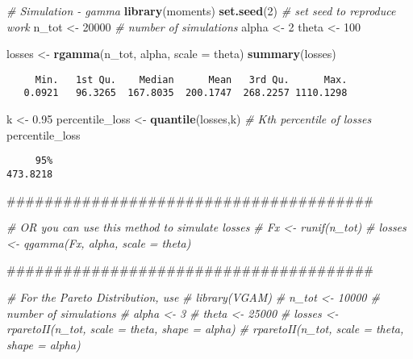 \documentclass[]{book}
\newenvironment{Shaded}{\begin{snugshade}}{\end{snugshade}}
\newcommand{\KeywordTok}[1]{\textcolor[rgb]{0.13,0.29,0.53}{\textbf{#1}}}
\newcommand{\DataTypeTok}[1]{\textcolor[rgb]{0.13,0.29,0.53}{#1}}
\newcommand{\DecValTok}[1]{\textcolor[rgb]{0.00,0.00,0.81}{#1}}
\newcommand{\FloatTok}[1]{\textcolor[rgb]{0.00,0.00,0.81}{#1}}
\newcommand{\StringTok}[1]{\textcolor[rgb]{0.31,0.60,0.02}{#1}}
\newcommand{\CommentTok}[1]{\textcolor[rgb]{0.56,0.35,0.01}{\textit{#1}}}
\newcommand{\NormalTok}[1]{#1}
\theoremstyle{definition}
\theoremstyle{definition}
\theoremstyle{definition}
\theoremstyle{remark}
\begin{document}
\begin{Shaded}
\begin{Highlighting}[]
\CommentTok{# Simulation - gamma}
\KeywordTok{library}\NormalTok{(moments)}
\KeywordTok{set.seed}\NormalTok{(}\DecValTok{2}\NormalTok{)  }\CommentTok{# set seed to reproduce work }
\NormalTok{n_tot <-}\StringTok{ }\DecValTok{20000}  \CommentTok{# number of simulations}
\NormalTok{alpha <-}\StringTok{ }\DecValTok{2}
\NormalTok{theta <-}\StringTok{ }\DecValTok{100}
         
\NormalTok{losses <-}\StringTok{ }\KeywordTok{rgamma}\NormalTok{(n_tot, alpha, }\DataTypeTok{scale =}\NormalTok{ theta)  }
\KeywordTok{summary}\NormalTok{(losses)}
\end{Highlighting}
\end{Shaded}

\begin{verbatim}
     Min.   1st Qu.    Median      Mean   3rd Qu.      Max. 
   0.0921   96.3265  167.8035  200.1747  268.2257 1110.1298 
\end{verbatim}

\begin{Shaded}
\begin{Highlighting}[]
\NormalTok{k <-}\StringTok{ }\FloatTok{0.95}
\NormalTok{percentile_loss <-}\StringTok{ }\KeywordTok{quantile}\NormalTok{(losses,k)  }\CommentTok{# Kth percentile of losses }
\NormalTok{percentile_loss}
\end{Highlighting}
\end{Shaded}

\begin{verbatim}
     95% 
473.8218 
\end{verbatim}

\begin{Shaded}
\begin{Highlighting}[]
\NormalTok{#######################################}

\CommentTok{# OR you can use this method to simulate losses }
\CommentTok{# Fx <- runif(n_tot)}
\CommentTok{# losses <- qgamma(Fx, alpha, scale = theta)}

\NormalTok{#######################################}

\CommentTok{# For the Pareto Distribution, use}
\CommentTok{# library(VGAM)}
\CommentTok{# n_tot <- 10000  # number of simulations}
\CommentTok{# alpha <- 3}
\CommentTok{# theta <- 25000}
\CommentTok{# losses <- rparetoII(n_tot, scale = theta, shape = alpha)}
\CommentTok{# rparetoII(n_tot, scale = theta, shape = alpha) }
\end{Highlighting}
\end{Shaded}
\end{document}
